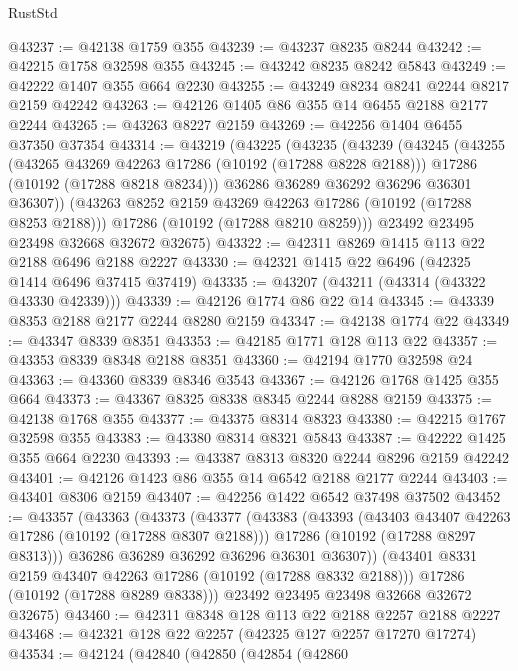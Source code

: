 \begin{lexlean}{RustStd}
\begin{coremodule}
@43237 := @42138 @1759 @355
@43239 := @43237 @8235 @8244
@43242 := @42215 @1758 @32598 @355
@43245 := @43242 @8235 @8242 @5843
@43249 := @42222 @1407 @355 @664 @2230
@43255 := @43249 @8234 @8241 @2244 @8217 @2159 @42242
@43263 := @42126 @1405 @86 @355 @14 @6455 @2188 @2177 @2244
@43265 := @43263 @8227 @2159
@43269 := @42256 @1404 @6455 @37350 @37354
@43314 := @43219
    (@43225
      (@43235
        (@43239
          (@43245
            (@43255
              (@43265 @43269 @42263 @17286 (@10192 (@17288 @8228 @2188)))
              @17286
              (@10192 (@17288 @8218 @8234)))
            @36286
            @36289
            @36292
            @36296
            @36301
            @36307))
        (@43263 @8252 @2159 @43269 @42263 @17286 (@10192 (@17288 @8253 @2188)))
        @17286
        (@10192 (@17288 @8210 @8259)))
      @23492
      @23495
      @23498
      @32668
      @32672
      @32675)
@43322 := @42311 @8269 @1415 @113 @22 @2188 @6496 @2188 @2227
@43330 := @42321 @1415 @22 @6496 (@42325 @1414 @6496 @37415 @37419)
@43335 := @43207 (@43211 (@43314 (@43322 @43330 @42339)))
@43339 := @42126 @1774 @86 @22 @14
@43345 := @43339 @8353 @2188 @2177 @2244 @8280 @2159
@43347 := @42138 @1774 @22
@43349 := @43347 @8339 @8351
@43353 := @42185 @1771 @128 @113 @22
@43357 := @43353 @8339 @8348 @2188 @8351
@43360 := @42194 @1770 @32598 @24
@43363 := @43360 @8339 @8346 @3543
@43367 := @42126 @1768 @1425 @355 @664
@43373 := @43367 @8325 @8338 @8345 @2244 @8288 @2159
@43375 := @42138 @1768 @355
@43377 := @43375 @8314 @8323
@43380 := @42215 @1767 @32598 @355
@43383 := @43380 @8314 @8321 @5843
@43387 := @42222 @1425 @355 @664 @2230
@43393 := @43387 @8313 @8320 @2244 @8296 @2159 @42242
@43401 := @42126 @1423 @86 @355 @14 @6542 @2188 @2177 @2244
@43403 := @43401 @8306 @2159
@43407 := @42256 @1422 @6542 @37498 @37502
@43452 := @43357
    (@43363
      (@43373
        (@43377
          (@43383
            (@43393
              (@43403 @43407 @42263 @17286 (@10192 (@17288 @8307 @2188)))
              @17286
              (@10192 (@17288 @8297 @8313)))
            @36286
            @36289
            @36292
            @36296
            @36301
            @36307))
        (@43401 @8331 @2159 @43407 @42263 @17286 (@10192 (@17288 @8332 @2188)))
        @17286
        (@10192 (@17288 @8289 @8338)))
      @23492
      @23495
      @23498
      @32668
      @32672
      @32675)
@43460 := @42311 @8348 @128 @113 @22 @2188 @2257 @2188 @2227
@43468 := @42321 @128 @22 @2257 (@42325 @127 @2257 @17270 @17274)
@43534 := @42124
    (@42840
      (@42850
        (@42854
          (@42860

\end{coremodule}
\end{lexlean}
